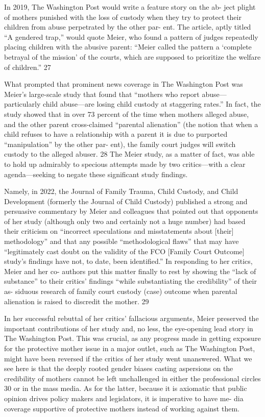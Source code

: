 In 2019, The Washington Post would write a feature story on the ab-
ject plight of mothers punished with the loss of custody when they
try to protect their children from abuse perpetrated by the other par-
ent. The article, aptly titled “A gendered trap,” would quote Meier,
who found a pattern of judges repeatedly placing children with the
abusive parent: “Meier called the pattern a ‘complete betrayal of the
mission’ of the courts, which are supposed to prioritize the welfare of
children.” 27 \pfl{}


What prompted that prominent news coverage in The Washington
Post was Meier’s large-scale study that found that “mothers who report
abuse—particularly child abuse—are losing child custody at staggering
rates.” In fact, the study showed that in over 73 percent of the time when
mothers alleged abuse, and the other parent cross-claimed “parental
alienation” (the notion that when a child refuses to have a relationship
with a parent it is due to purported “manipulation” by the other par-
ent), the family court judges will switch custody to the alleged abuser. 28
The Meier study, as a matter of fact, was able to hold up admirably to
specious attempts made by two critics—with a clear agenda—seeking to
negate these significant study findings. \pfl{}


Namely, in 2022, the Journal of Family Trauma, Child Custody, and
Child Development (formerly the Journal of Child Custody) published a
strong and persuasive commentary by Meier and colleagues that pointed
out that opponents of her study (although only two and certainly not
a huge number) had based their criticism on “incorrect speculations
and misstatements about [their] methodology” and that any possible
“methodological flaws” that may have “legitimately cast doubt on the
validity of the FCO [Family Court Outcome] study’s findings have not,
to date, been identified.” In responding to her critics, Meier and her co-
authors put this matter finally to rest by showing the “lack of substance”
to their critics’ findings “while substantiating the credibility” of their as-
siduous research of family court custody (case) outcome when parental
alienation is raised to discredit the mother. 29 \pfl{}


In her successful rebuttal of her critics’ fallacious arguments, Meier
preserved the important contributions of her study and, no less, the
eye-opening lead story in The Washington Post. This was crucial, as any
progress made in getting exposure for the protective mother issue in a
major outlet, such as The Washington Post, might have been reversed
if the critics of her study went unanswered. What we see here is that
the deeply rooted gender biases casting aspersions on the credibility of
mothers cannot be left unchallenged in either the professional circles 30
or in the mass media. As for the latter, because it is axiomatic that public
opinion drives policy makers and legislators, it is imperative to have me-
dia coverage supportive of protective mothers instead of working against
them. \pfl{}


